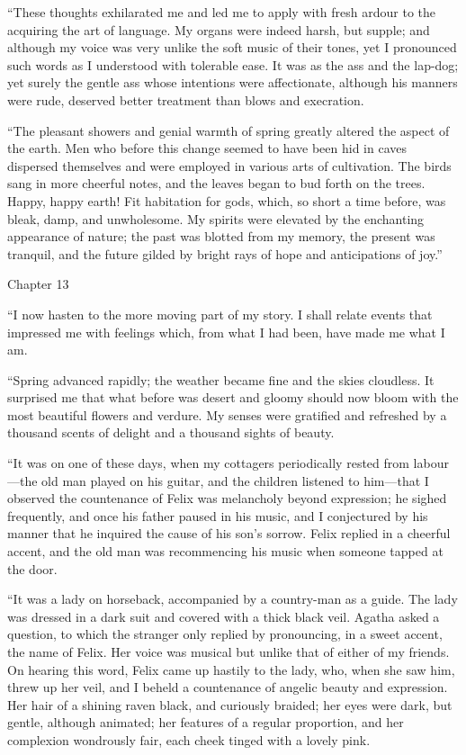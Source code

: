 \documentclass[12pt,openright]{book}
\begin{document}
“These thoughts exhilarated me and led me to apply with fresh ardour to the acquiring the art of language. My organs were indeed harsh, but supple; and although my voice was very unlike the soft music of their tones, yet I pronounced such words as I understood with tolerable ease. It was as the ass and the lap-dog; yet surely the gentle ass whose intentions were affectionate, although his manners were rude, deserved better treatment than blows and execration.

“The pleasant showers and genial warmth of spring greatly altered the aspect of the earth. Men who before this change seemed to have been hid in caves dispersed themselves and were employed in various arts of cultivation. The birds sang in more cheerful notes, and the leaves began to bud forth on the trees. Happy, happy earth! Fit habitation for gods, which, so short a time before, was bleak, damp, and unwholesome. My spirits were elevated by the enchanting appearance of nature; the past was blotted from my memory, the present was tranquil, and the future gilded by bright rays of hope and anticipations of joy.”

Chapter 13

“I now hasten to the more moving part of my story. I shall relate events that impressed me with feelings which, from what I had been, have made me what I am.

“Spring advanced rapidly; the weather became fine and the skies cloudless. It surprised me that what before was desert and gloomy should now bloom with the most beautiful flowers and verdure. My senses were gratified and refreshed by a thousand scents of delight and a thousand sights of beauty.

“It was on one of these days, when my cottagers periodically rested from labour—the old man played on his guitar, and the children listened to him—that I observed the countenance of Felix was melancholy beyond expression; he sighed frequently, and once his father paused in his music, and I conjectured by his manner that he inquired the cause of his son’s sorrow. Felix replied in a cheerful accent, and the old man was recommencing his music when someone tapped at the door.

“It was a lady on horseback, accompanied by a country-man as a guide. The lady was dressed in a dark suit and covered with a thick black veil. Agatha asked a question, to which the stranger only replied by pronouncing, in a sweet accent, the name of Felix. Her voice was musical but unlike that of either of my friends. On hearing this word, Felix came up hastily to the lady, who, when she saw him, threw up her veil, and I beheld a countenance of angelic beauty and expression. Her hair of a shining raven black, and curiously braided; her eyes were dark, but gentle, although animated; her features of a regular proportion, and her complexion wondrously fair, each cheek tinged with a lovely pink.
\end{document}
